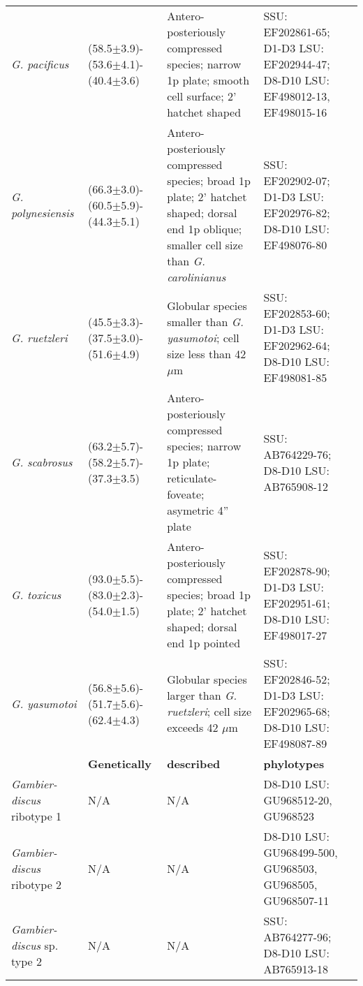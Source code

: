 \documentclass[12pt]{article}
\begin{document}
\begin{longtable}{  p{2cm}  p{2.7cm}  p{4.5cm}  p{3.1cm}  p{1cm}  }
  \emph{G. pacificus} & (58.5$\pm$3.9)-(53.6$\pm$4.1)-(40.4$\pm$3.6) & Antero-posteriously compressed species; narrow 1p plate; smooth cell surface; 2' hatchet shaped & SSU: EF202861-65; D1-D3 LSU: EF202944-47; D8-D10 LSU: EF498012-13, EF498015-16  & \cite{litaker2009taxonomy,chinain1999morphology} \\
 \emph{G. polynesiensis} & (66.3$\pm$3.0)-(60.5$\pm$5.9)-(44.3$\pm$5.1) & Antero-posteriously compressed species; broad 1p plate; 2’ hatchet shaped; dorsal end 1p oblique; smaller cell size than \emph{G. carolinianus} & SSU: EF202902-07; D1-D3 LSU: EF202976-82; D8-D10 LSU: EF498076-80  & \cite{litaker2009taxonomy,chinain1999morphology} \\
 \emph{G. ruetzleri} & (45.5$\pm$3.3)-(37.5$\pm$3.0)-(51.6$\pm$4.9) & Globular species smaller than \emph{G. yasumotoi}; cell size less than 42$\mu$m & SSU: EF202853-60; D1-D3 LSU: EF202962-64; D8-D10 LSU: EF498081-85 & \cite{litaker2009taxonomy} \\
 \emph{G. scabrosus} & (63.2$\pm$5.7)-(58.2$\pm$5.7)-(37.3$\pm$3.5) & Antero-posteriously compressed species; narrow 1p plate; reticulate-foveate; asymetric 4'' plate & SSU: AB764229-76; D8-D10 LSU: AB765908-12  & \cite{nishimura2013genetic,nishimura2014morphology,kuno2010genetic} \\ %
 \emph{G. toxicus} & (93.0$\pm$5.5)-(83.0$\pm$2.3)-(54.0$\pm$1.5) & Antero-posteriously compressed species; broad 1p plate; 2’ hatchet shaped; dorsal end 1p pointed & SSU: EF202878-90; D1-D3 LSU: EF202951-61; D8-D10 LSU: EF498017-27 & \cite{litaker2009taxonomy,adachi1979thecal,chinain1997intraspecific,richlen2008phylogeography} \\
  \emph{G. yasumotoi} & (56.8$\pm$5.6)-(51.7$\pm$5.6)-(62.4$\pm$4.3) & Globular species larger than \emph{G. ruetzleri}; cell size exceeds 42 $\mu$m & SSU: EF202846-52; D1-D3 LSU: EF202965-68; D8-D10 LSU: EF498087-89 & \cite{holmes1998gambierdiscus,litaker2009taxonomy} \\
  \hline
    & \textbf{Genetically} & \textbf{described} & \textbf{phylotypes} & \\
 \emph{Gambier- discus} ribotype 1 & N/A & N/A  & D8-D10 LSU: GU968512-20, GU968523 & \cite{litaker2010global} \\
 \emph{Gambier- discus} ribotype 2 & N/A & N/A & D8-D10 LSU: GU968499-500, GU968503, GU968505, GU968507-11  & \cite{litaker2010global} \\
 \emph{Gambier- discus} sp. type 2 & N/A & N/A & SSU: AB764277-96; D8-D10 LSU: AB765913-18 & \cite{kuno2010genetic,nishimura2013genetic} \\

\end{longtable}
\end{document}
